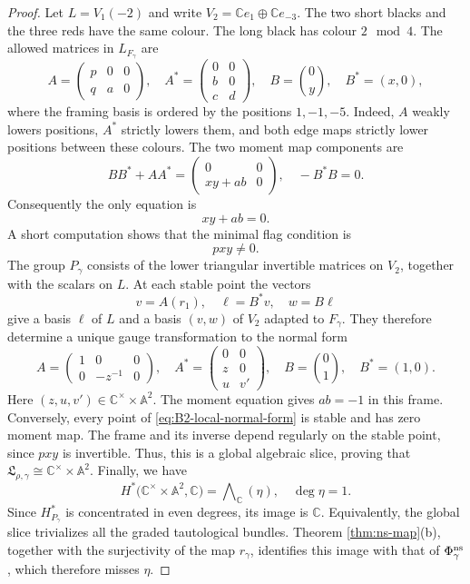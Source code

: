 \documentclass[11pt,reqno]{amsart}
\theoremstyle{definition}
\theoremstyle{remark}
\def\bbC{\mathbb C}
\begin{document}
\begin{proof}
Let $L=V_1(-2)$ and write $V_2=\bbC e_1\oplus\bbC e_{-3}$.
The two short blacks and the three reds have the same colour.
The long black has colour $2\mod4$.
The allowed matrices in
$L_{F_\gamma}$ are
\begin{equation}\label{eq:B2-local-matrices}
 A=\begin{pmatrix}p&0&0\\q&a&0\end{pmatrix},\quad
 A^*=\begin{pmatrix}0&0\\b&0\\c&d\end{pmatrix},\quad
 B=\binom{0}{y},\quad B^*=(x,0),
\end{equation}
where the framing basis is ordered by the positions $1,-1,-5$.
Indeed, $A$ weakly lowers positions, $A^*$ strictly lowers them,
and both edge maps strictly lower positions between these colours.
The two moment map components are
\[
 BB^*+AA^*=\begin{pmatrix}0&0\\xy+ab&0\end{pmatrix},
 \quad -B^*B=0.
\]
Consequently the only equation is $$xy+ab=0.$$
A short computation shows  that the minimal flag condition is
\begin{equation}\label{eq:B2-local-stability}
 pxy\ne 0.
\end{equation}
The group $P_\gamma$ consists of the lower triangular invertible
matrices on $V_2$, together with the scalars on $L$.
At each stable point the vectors
\[
 v=A(r_1),\quad \ell=B^*v,\quad w=B\ell
\]
give a basis $\ell$ of $L$ and a basis $(v,w)$ of $V_2$ adapted
to $F_\gamma$. They therefore determine a unique gauge
transformation to the normal form
\begin{equation}\label{eq:B2-local-normal-form}
 A=\begin{pmatrix}1&0&0\\0&-z^{-1}&0\end{pmatrix},\quad
 A^*=\begin{pmatrix}0&0\\z&0\\u&v'\end{pmatrix},\quad
 B=\binom{0}{1},\quad B^*=(1,0).
\end{equation}
Here $(z,u,v')\in\bbC^\times\times\mathbb A^2$.
The moment equation gives $ab=-1$ in this frame. Conversely,
every point of \eqref{eq:B2-local-normal-form} is stable and has zero moment map. 
The frame and its inverse depend regularly on the stable point, since $pxy$ is invertible. 
Thus, this is a global algebraic slice, proving that
$\mathfrak L_{\rho,\gamma}\cong\bbC^\times\times\mathbb A^2$.
Finally, we have
\[
 H^*\big(\bbC^\times\times\mathbb A^2,\bbC\big)
     =\bigwedge\nolimits_{\bbC}(\eta),\quad \deg\eta=1.
\]
Since $H^*_{P_\gamma}$ is concentrated in even degrees,
its image is $\bbC$. Equivalently, the global slice
trivializes all the graded tautological bundles. Theorem
\ref{thm:ns-map}(b), together with the surjectivity of the map $r_\gamma$, 
identifies this image with that of $\Phi^{\rm ns}_\gamma$, which therefore misses $\eta$.
\end{proof}
\end{document}
